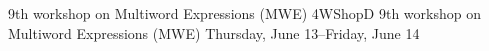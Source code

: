 \begin{wsschedule}
{9th workshop on Multiword Expressions (MWE)}
{4}{WShopD}
{9th workshop on Multiword Expressions (MWE)}
{Thursday, June 13--Friday, June 14}{\WShopLocD}

\end{wsschedule}
